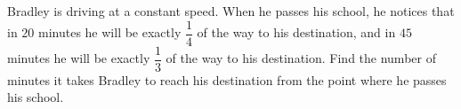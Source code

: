 Bradley is driving at a constant speed. When he passes his school, he notices that in $20$ minutes he will be exactly $\dfrac14$ of the way to his destination, and in $45$ minutes he will be exactly $\dfrac13$ of the way to his destination. Find the number of minutes it takes Bradley to reach his destination from the point where he passes his school.
